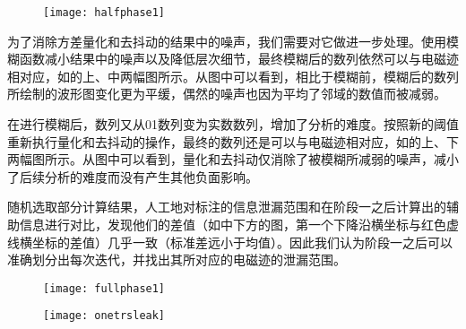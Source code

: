 {	\begin{figure}[!h]
		\begin{center}
			\texttt{[image: halfphase1]}
			\label{fig:halfphase1}
		\end{center}
	\end{figure}

	为了消除方差量化和去抖动的结果中的噪声，我们需要对它做进一步处理。使用模糊函数减小结果中的噪声以及降低层次细节，最终模糊后的数列依然可以与电磁迹相对应，如的上、中两幅图所示。从图中可以看到，相比于模糊前，模糊后的数列所绘制的波形图变化更为平缓，偶然的噪声也因为平均了邻域的数值而被减弱。
	
	在进行模糊后，数列又从01数列变为实数数列，增加了分析的难度。按照新的阈值重新执行量化和去抖动的操作，最终的数列还是可以与电磁迹相对应，如的上、下两幅图所示。从图中可以看到，量化和去抖动仅消除了被模糊所减弱的噪声，减小了后续分析的难度而没有产生其他负面影响。

	随机选取部分计算结果，人工地对标注的信息泄漏范围和在阶段一之后计算出的辅助信息进行对比，发现他们的差值（如中下方的图，第一个下降沿横坐标与红色虚线横坐标的差值）几乎一致（标准差远小于均值）。因此我们认为阶段一之后可以准确划分出每次迭代，并找出其所对应的电磁迹的泄漏范围。
	
	\begin{figure}[!h]
		\begin{center}
			\texttt{[image: fullphase1]}
			\label{fig:fullphase1}
		\end{center}
	\end{figure}
	
	\begin{figure}[!h]
		\begin{center}
			\texttt{[image: onetrsleak]}
			\label{fig:onetrsleak}
		\end{center}
	\end{figure}

}
